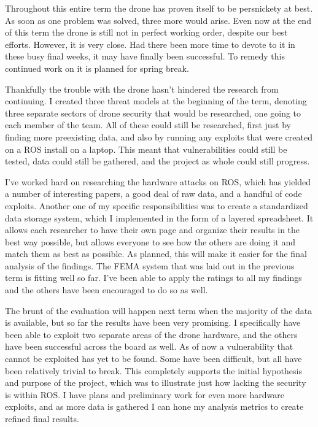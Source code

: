 \documentclass[IEEEtran,letterpaper,12pt,notitlepage,draftclsnofoot,onecolumn]{article}
\begin{document}
Throughout this entire term the drone has proven itself to be persnickety at best.
As soon as one problem was solved, three more would arise.
Even now at the end of this term the drone is still not in perfect working order, despite our best efforts.
However, it is very close. 
Had there been more time to devote to it in these busy final weeks, it may have finally been successful.
To remedy this continued work on it is planned for spring break.

Thankfully the trouble with the drone hasn't hindered the research from continuing.
I created three threat models at the beginning of the term, denoting three separate sectors of drone security that would be researched, one going to each member of the team.
All of these could still be researched, first just by finding more preexisting data, and also by running any exploits that were created on a ROS install on a laptop.
This meant that vulnerabilities could still be tested, data could still be gathered, and the project as whole could still progress.

I've worked hard on researching the hardware attacks on ROS, which has yielded a number of interesting papers, a good deal of raw data, and a handful of code exploits. 
Another one of my specific responsibilities was to create a standardized data storage system, which I implemented in the form of a layered spreadsheet.
It allows each researcher to have their own page and organize their results in the best way possible, but allows everyone to see how the others are doing it and match them as best as possible.
As planned, this will make it easier for the final analysis of the findings.
The FEMA system that was laid out in the previous term is fitting well so far. 
I've been able to apply the ratings to all my findings and the others have been encouraged to do so as well.

The brunt of the evaluation will happen next term when the majority of the data is available, but so far the results have been very promising.
I specifically have been able to exploit two separate areas of the drone hardware, and the others have been successful across the board as well.
As of now a vulnerability that cannot be exploited has yet to be found.
Some have been difficult, but all have been relatively trivial to break.
This completely supports the initial hypothesis and purpose of the project, which was to illustrate just how lacking the security is within ROS. 
I have plans and preliminary work for even more hardware exploits, and as more data is gathered I can hone my analysis metrics to create refined final results.
\end{document}
